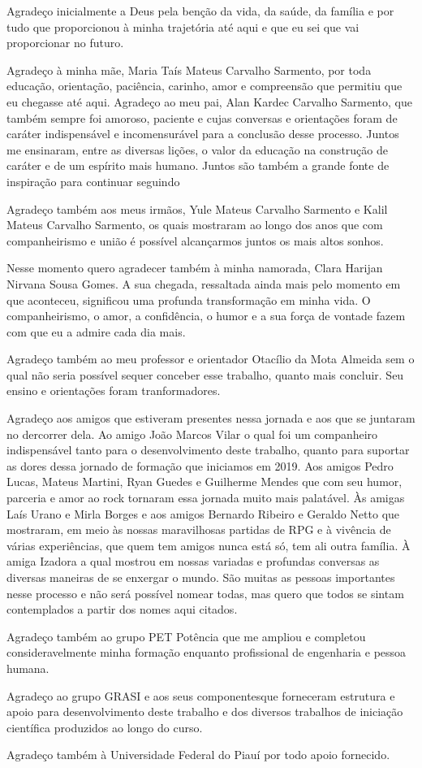 Agradeço inicialmente a Deus pela benção da vida, da saúde, da família e por tudo que proporcionou à minha trajetória até aqui e que eu sei que vai proporcionar no futuro.

Agradeço à minha mãe, Maria Taís Mateus Carvalho Sarmento, por toda educação, orientação, paciência, carinho, amor e compreensão que permitiu que eu chegasse até aqui. Agradeço ao meu pai, Alan Kardec Carvalho Sarmento, que também sempre foi amoroso, paciente e cujas conversas e orientações foram de caráter indispensável e incomensurável para a conclusão desse processo. Juntos me ensinaram, entre as diversas lições, o valor da educação na construção de caráter e de um espírito mais humano. Juntos são também a grande fonte de inspiração para continuar seguindo 

Agradeço também aos meus irmãos, Yule Mateus Carvalho Sarmento e Kalil Mateus Carvalho Sarmento, os quais mostraram ao longo dos anos que com companheirismo e união é possível alcançarmos juntos os mais altos sonhos.

Nesse momento quero agradecer também à minha namorada, Clara Harijan Nirvana Sousa Gomes. A sua chegada, ressaltada ainda mais pelo momento em que aconteceu, significou uma profunda transformação em minha vida. O companheirismo, o amor, a confidência, o humor e a sua força de vontade fazem com que eu a admire cada dia mais.

Agradeço também ao meu professor e orientador Otacílio da Mota Almeida sem o qual não seria possível sequer conceber esse trabalho, quanto mais concluir. Seu ensino e orientações foram tranformadores.

Agradeço aos amigos que estiveram presentes nessa jornada e aos que se juntaram no dercorrer dela. Ao amigo João Marcos Vilar o qual foi um companheiro indispensável tanto para o desenvolvimento deste trabalho, quanto para suportar as dores dessa jornado de formação que iniciamos em 2019. Aos amigos Pedro Lucas, Mateus Martini, Ryan Guedes e Guilherme Mendes que com seu humor, parceria e amor ao rock tornaram essa jornada muito mais palatável. Às amigas Laís Urano e Mirla Borges e aos amigos Bernardo Ribeiro e Geraldo Netto que mostraram, em meio às nossas maravilhosas partidas de RPG e à vivência de várias experiências, que quem tem amigos nunca está só, tem ali outra família. À amiga Izadora a qual mostrou em nossas variadas e profundas conversas as diversas maneiras de se enxergar o mundo. São muitas as pessoas importantes nesse processo e não será possível nomear todas, mas quero que todos se sintam contemplados a partir dos nomes aqui citados.

Agradeço também ao grupo PET Potência que me ampliou e completou consideravelmente minha formação enquanto profissional de engenharia e pessoa humana.

Agradeço ao grupo GRASI e aos seus componentesque forneceram estrutura e apoio para desenvolvimento deste trabalho e dos diversos trabalhos de iniciação científica produzidos ao longo do curso.

Agradeço também à Universidade Federal do Piauí por todo apoio fornecido.